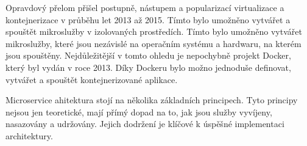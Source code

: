 Opravdový přelom přišel postupně, nástupem a popularizací virtualizace a kontejnerizace v průběhu let 2013 až 2015. Tímto bylo umožněno vytvářet a spouštět mikroslužby v izolovaných prostředích. Tímto bylo umožněno vytvářet mikroslužby, které jsou nezávislé na operačním systému a hardwaru, na kterém jsou spouštěny. Nejdůležitější v tomto ohledu je nepochybně projekt Docker, který byl vydán v roce 2013. \cite{dockerdocs} Díky Dockeru bylo možno jednoduše definovat, vytvářet a spouštět kontejnerizované aplikace. 


Microservice ahitektura stojí na několika základních principech. Tyto principy nejsou jen teoretické, mají přímý dopad na to, jak jsou služby vyvíjeny, nasazovány a udržovány. Jejich dodržení je klíčové k úspěšné implementaci architektury. \cite{Richardson2018}

